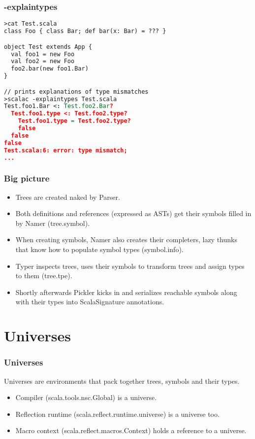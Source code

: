 \documentclass[hyperref={bookmarks=false}]{beamer}
\begin{document}
\begin{frame}[fragile]
\frametitle{-explaintypes}

\begin{lstlisting}[language=XML]
>cat Test.scala
class Foo { class Bar; def bar(x: Bar) = ??? }

object Test extends App {
  val foo1 = new Foo
  val foo2 = new Foo
  foo2.bar(new foo1.Bar)
}

// prints explanations of type mismatches
>scalac -explaintypes Test.scala
Test.foo1.Bar <: Test.foo2.Bar?
  Test.foo1.type <: Test.foo2.type?
    Test.foo1.type = Test.foo2.type?
    false
  false
false
Test.scala:6: error: type mismatch;
...
\end{lstlisting}
\end{frame}

\begin{frame}[fragile]
\frametitle{Big picture}

\begin{itemize}
\item Trees are created naked by Parser.
\item Both definitions and references (expressed as ASTs) get their symbols filled in by Namer (tree.symbol).
\item When creating symbols, Namer also creates their completers, lazy thunks that know how to populate symbol types (symbol.info).
\item Typer inspects trees, uses their symbols to transform trees and assign types to them (tree.tpe).
\item Shortly afterwards Pickler kicks in and serializes reachable symbols along with their types into ScalaSignature annotations.
\end{itemize}
\end{frame}

\section{Universes}

\begin{frame}[fragile]
\frametitle{Universes}

Universes are environments that pack together trees, symbols and their types.

\begin{itemize}
\item Compiler (scala.tools.nsc.Global) is a universe.
\item Reflection runtime (scala.reflect.runtime.universe) is a universe too.
\item Macro context (scala.reflect.macros.Context) holds a reference to a universe.
\end{itemize}
\end{frame}
\end{document}
